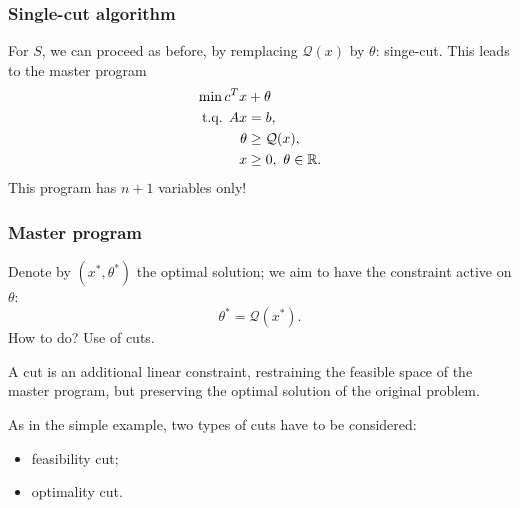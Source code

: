 \documentclass{beamer}
\begin{document}
\begin{frame}
\frametitle{Single-cut algorithm}
	
For $S$, we can proceed as before, by remplacing $\mathcal{Q}(x)$ by $\theta$: singe-cut.
This leads to the {\red master program}
\begin{align*}
	\min c^Tx & + \theta \\
	\mbox{t.q. } Ax & = b, \\
	\theta &\geq \mathcal{Q}(x),\\
	x & \geq 0,\ \theta \in {\mathbb{R}}.
\end{align*}
This program has $n+1$ variables only!



\end{frame}

\begin{frame}
\frametitle{Master program}
	
Denote by $(x^*, \theta^*)$ the optimal solution; we aim to have the constraint active on $\theta$:
\[
\theta^* = \mathcal{Q}(x^*).
\]
How to do? Use of cuts.
	
\mbox{}

A cut is an additional linear constraint, restraining the feasible space of the master program, but preserving the optimal solution of the original problem.
	
\mbox{}
	
As in the simple example, two types of cuts have to be considered:
\begin{itemize}
\item
\mbox{\red feasibility} cut;
\item
\mbox{\red optimality} cut.
\end{itemize}
	
\end{frame}
\end{document}

